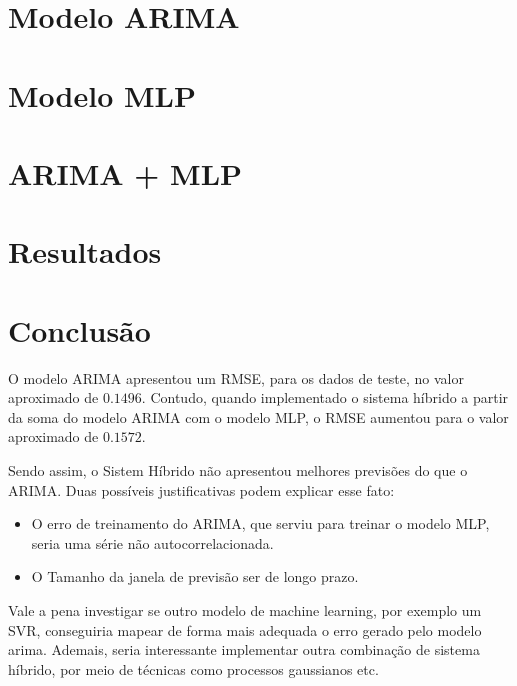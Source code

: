 \documentclass{article}
\begin{document}
\section{Modelo ARIMA}

\section{Modelo MLP}

\section{ARIMA + MLP}

\section{Resultados}

\section{Conclusão}
O modelo ARIMA apresentou um RMSE, para os dados de teste, no valor aproximado de $0.1496$. Contudo, quando implementado o sistema híbrido a partir da soma do modelo ARIMA com o modelo MLP, o RMSE aumentou para o valor aproximado de $0.1572$.

Sendo assim, o Sistem Híbrido não apresentou melhores previsões do que o ARIMA. Duas possíveis justificativas podem explicar esse fato:
\begin{itemize}
    \item O erro de treinamento do ARIMA, que serviu para treinar o modelo MLP, seria uma série não autocorrelacionada.
    \item O Tamanho da janela de previsão ser de longo prazo.
\end{itemize}
Vale a pena investigar se outro modelo de machine learning, por exemplo um SVR, conseguiria mapear de forma mais adequada o erro gerado pelo modelo arima. Ademais, seria interessante implementar outra combinação de sistema híbrido, por meio de técnicas como processos gaussianos etc.
\end{document}
